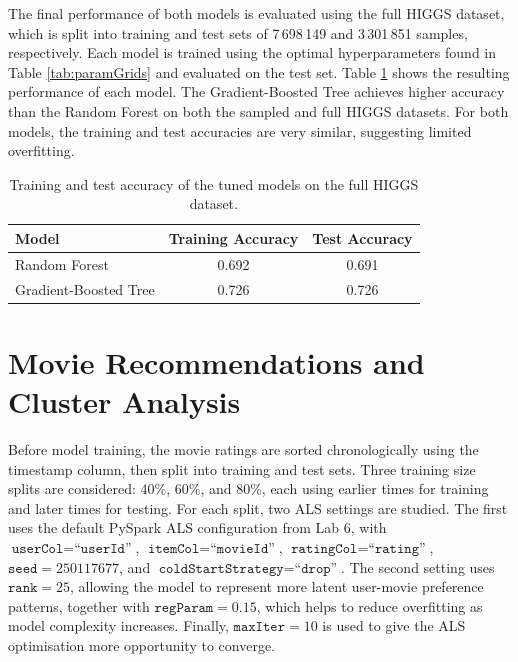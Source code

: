 \documentclass[12pt, a4paper]{article}
\begin{document}
The final performance of both models is evaluated using the full HIGGS dataset, which is split into training and test sets of 7\,698\,149 and 3\,301\,851 samples, respectively.
Each model is trained using the optimal hyperparameters found in Table \ref{tab:paramGrids} and evaluated on the test set.
Table \ref{tab:q3_full_performance} shows the resulting performance of each model.
The Gradient-Boosted Tree achieves higher accuracy than the Random Forest on both the sampled and full HIGGS datasets.
For both models, the training and test accuracies are very similar, suggesting limited overfitting.
\begin{table}[htbp]
    \centering
    \caption{Training and test accuracy of the tuned models on the full HIGGS dataset.}
    \label{tab:q3_full_performance}
    \begin{tabular}{lcc}
        \toprule
        Model & Training Accuracy & Test Accuracy \\
        \midrule
        Random Forest & 0.692 & 0.691 \\
        Gradient-Boosted Tree & 0.726 & 0.726 \\
        \bottomrule
    \end{tabular}
\end{table}



\FloatBarrier
\section{Movie Recommendations and Cluster Analysis} 
Before model training, the movie ratings are sorted chronologically using the timestamp column, then split into training and test sets.
Three training size splits are considered: 40\%, 60\%, and 80\%, each using earlier times for training and later times for testing.
For each split, two ALS settings are studied.
The first uses the default PySpark ALS configuration from Lab 6, with \(\texttt{userCol}=\texttt{``userId''}\), \(\texttt{itemCol}=\texttt{``movieId''}\), \(\texttt{ratingCol}=\texttt{``rating''}\), \(\texttt{seed}=250117677\), and \(\texttt{coldStartStrategy}=\texttt{``drop''}\).
The second setting uses \(\texttt{rank}=25\), allowing the model to represent more latent user-movie preference patterns, together with \(\texttt{regParam}=0.15\), which helps to reduce overfitting as model complexity increases.
Finally, \(\texttt{maxIter}=10\) is used to give the ALS optimisation more opportunity to converge.
\end{document}
